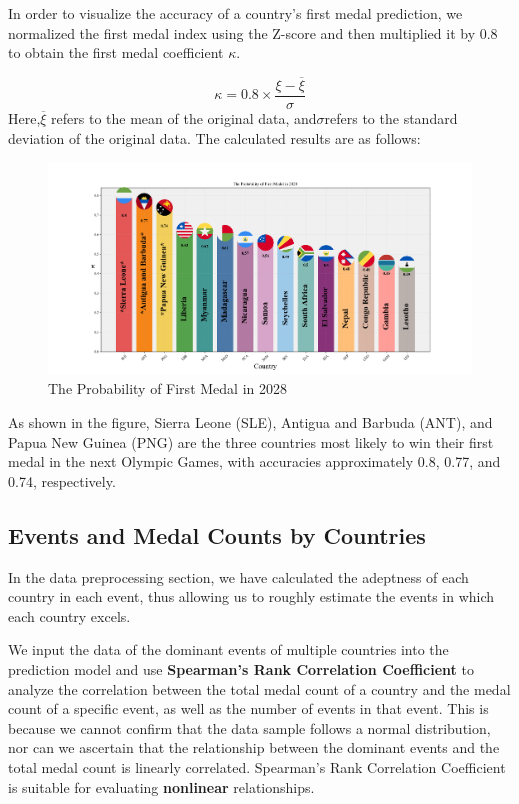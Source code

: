 \documentclass[12pt]{article}  %
\begin{document}
In order to visualize the accuracy of a country's first medal prediction, we normalized the first medal index using the Z-score and then multiplied it by 0.8 to obtain the first medal coefficient $\kappa$.

\begin{equation}
	\kappa = 0.8 \times \frac{\xi - \overline{\xi}}{\sigma}
\end{equation}
Here,$\overline{\xi}$ refers to the mean of the original data, and$\sigma$refers to the standard deviation of the original data.
The calculated results are as follows:
\begin{figure}[htbp]
	\centering
	\includegraphics[width=16cm]{img/First.png}
	\caption{The Probability of First Medal in 2028}
	\label{fig:aa}
\end{figure}


As shown in the figure, Sierra Leone (SLE), Antigua and Barbuda (ANT), and Papua New Guinea (PNG) are the three countries most likely to win their first medal in the next Olympic Games, with accuracies approximately 0.8, 0.77, and 0.74, respectively.


\subsection{Events and Medal Counts by Countries}
In the data preprocessing section, we have calculated the adeptness of each country in each event, thus allowing us to roughly estimate the events in which each country excels.

We input the data of the dominant events of multiple countries into the prediction model and use \textbf{Spearman's Rank Correlation Coefficient} to analyze the correlation between the total medal count of a country and the medal count of a specific event, as well as the number of events in that event. This is because we cannot confirm that the data sample follows a normal distribution, nor can we ascertain that the relationship between the dominant events and the total medal count is linearly correlated. Spearman's Rank Correlation Coefficient is suitable for evaluating \textbf{nonlinear} relationships.
\end{document}
